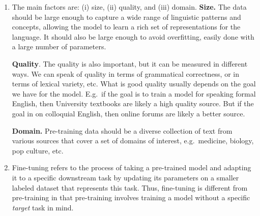 \documentclass[11pt,a4paper]{article}
\newcommand\op[1]{\operatorname{#1}}
\begin{document}
\begin{enumerate}[label=(\alph*)]
\begin{align}
          \end{align}
          \begin{align}
              \op{MLM}(S) & = - \frac{1}{|M|} \sum_{s=1}^{S} \sum_{m=1}^{M_s} \log p(x_m \mid x_1, x_2, \ldots, x_{|s|} \setminus M_s),
          \end{align}
          where $M = \{M_1 \cup M_2 \cup \ldots \cup M_{|S|}\}$ is the set of
          all masked tokens in $S$.
    \item The main factors are: (i) size, (ii) quality, and (iii) domain.
          \textbf{Size.} The data should be large enough to capture a wide range
          of linguistic patterns and concepts, allowing the model to learn a
          rich set of representations for the language.
          It should also be large enough to avoid overfitting, easily done with
          a large number of parameters.

          \textbf{Quality}. The quality is also important, but it can be
          measured in different ways.
          We can speak of quality in terms of grammatical correctness, or in
          terms of lexical variety, etc.
          What is good quality usually depends on the goal we have for the
          model.
          E.g.\ if the goal is to train a model for speaking formal English,
          then University textbooks are likely a high quality source.
          But if the goal in on colloquial English, then online forums are
          likely a better source.

          \textbf{Domain.} Pre-training data should be a diverse collection of
          text from various sources that cover a set of domains of interest,
          e.g.\ medicine, biology, pop culture, etc.
    \item Fine-tuning refers to the process of taking a pre-trained model and
          adapting it to a specific downstream task by updating its parameters
          on a smaller labeled dataset that represents this task.
          Thus, fine-tuning is different from pre-training in that pre-training
          involves training a model without a specific \emph{target} task
          in mind.


\end{enumerate}
\end{document}
